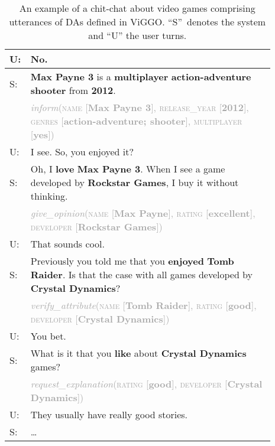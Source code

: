 \documentclass[11pt,a4paper]{article}
\begin{document}
\begin{table}
\begin{tabular}{p{0.02\linewidth} >{\raggedright\arraybackslash}p{0.87\linewidth}}
    	\hline
    	\rowcolor{light-gray}
    	U:  & No. \\
    	\hline
    	S:  & \textbf{Max Payne 3} is a \textbf{multiplayer} \textbf{action-adventure} \textbf{shooter} from \textbf{2012}. \\
    	& \textcolor{darkgray}{\emph{inform}(\textsc{name} [\textbf{Max Payne 3}], \textsc{release\_year} [\textbf{2012}], \textsc{genres} [\textbf{action-adventure; shooter}], \textsc{multiplayer} [\textbf{yes}])} \\
    	\hline
    	\rowcolor{light-gray}
    	U:  & I see. So, you enjoyed it? \\
    	\hline
    	S:  & Oh, I \textbf{love} \textbf{Max Payne 3}. When I see a game developed by \textbf{Rockstar Games}, I buy it without thinking. \\
    	& \textcolor{darkgray}{\emph{give\_opinion}(\textsc{name} [\textbf{Max Payne}], \textsc{rating} [\textbf{excellent}], \textsc{developer} [\textbf{Rockstar Games}])} \\
    	\hline
    	\rowcolor{light-gray}
    	U:  & That sounds cool. \\
    	\hline
    	S:  & Previously you told me that you \textbf{enjoyed} \textbf{Tomb Raider}. Is that the case with all games developed by \textbf{Crystal Dynamics}? \\
    	& \textcolor{darkgray}{\emph{verify\_attribute}(\textsc{name} [\textbf{Tomb Raider}], \textsc{rating} [\textbf{good}], \textsc{developer} [\textbf{Crystal Dynamics}])} \\
    	\hline
    	\rowcolor{light-gray}
    	U:  & You bet. \\
    	\hline
    	S:  & What is it that you \textbf{like} about \textbf{Crystal Dynamics} games? \\
    	& \textcolor{darkgray}{\emph{request\_explanation}(\textsc{rating} [\textbf{good}], \textsc{developer} [\textbf{Crystal Dynamics}])} \\
    	\hline
    	\rowcolor{light-gray}
    	U:  & They usually have really good stories. \\
    	\hline
    	S:  & \dots \\
    	\hline
    \end{tabular}
 	\vspace{-0.1cm}
	\caption{An example of a chit-chat about video games comprising utterances of DAs defined in ViGGO. ``S''~denotes the system and ``U'' the user turns.}
	\vspace{-0.4cm}
    \label{tab:ex_video_game_conversation}
 	\vspace{-0.1cm}
\end{table}
\end{document}
